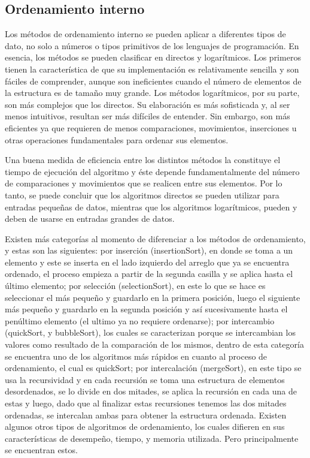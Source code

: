 \documentclass[11pt]{article}
\begin{document}
\subsection{Ordenamiento interno}
\par
Los métodos de ordenamiento interno se pueden aplicar a diferentes tipos de dato, no solo a números o tipos primitivos de los lenguajes de programación. En esencia, los métodos se pueden clasificar en directos y logarítmicos. Los primeros tienen la característica de que su implementación es relativamente sencilla y son fáciles de comprender, aunque son ineficientes cuando el número de elementos de la estructura es de tamaño muy grande. Los métodos logarítmicos, por su parte, son más complejos que los directos. Su elaboración es más sofisticada y, al ser menos intuitivos, resultan ser más difíciles de entender. Sin embargo, son más eficientes ya que requieren de menos comparaciones, movimientos, inserciones u otras operaciones fundamentales para ordenar sus elementos.
\par
Una buena medida de eficiencia entre los distintos métodos la constituye el tiempo de ejecución del algoritmo y éste depende fundamentalmente del número de comparaciones y movimientos que se realicen entre sus elementos. Por lo tanto, se puede concluir que los algoritmos directos se pueden utilizar para entradas pequeñas de datos, mientras que los algoritmos logarítmicos, pueden y deben de usarse en entradas grandes de datos.
\par
Existen más categorías al momento de diferenciar a los métodos de ordenamiento, y estas son las siguientes: por inserción (insertionSort), en donde se toma a un elemento y este se inserta en el lado izquierdo del arreglo que ya se encuentra ordenado, el proceso empieza a partir de la segunda casilla y se aplica hasta el último elemento; por selección (selectionSort), en este lo que se hace es seleccionar el más pequeño y guardarlo en la primera posición, luego el siguiente más pequeño y guardarlo en la segunda posición y así sucesivamente hasta el penúltimo elemento (el ultimo ya no requiere ordenarse); por intercambio (quickSort, y bubbleSort), los cuales se caracterizan porque se intercambian los valores como resultado de la comparación de los mismos, dentro de esta categoría se encuentra uno de los algoritmos más rápidos en cuanto al proceso de ordenamiento, el cual es quickSort; por intercalación (mergeSort), en este tipo se usa la recursividad y en cada recursión se toma una estructura de elementos desordenados, se lo divide en dos mitades, se aplica la recursión en cada una de estas y luego, dado que al finalizar estas recursiones tenemos las dos mitades ordenadas, se intercalan ambas para obtener la estructura ordenada. Existen algunos otros tipos de algoritmos de ordenamiento, los cuales difieren en sus características de desempeño, tiempo, y memoria utilizada. Pero principalmente se encuentran estos. 
\end{document}
